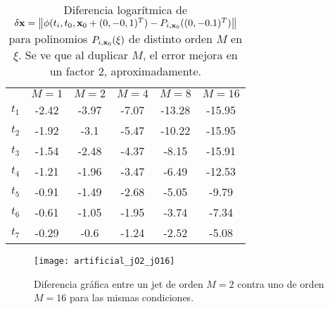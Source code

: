 \begin{table}[h!]
\centering
\begin{tabular}{c|ccccc}
\toprule
               & \textbf{$ M = 1 $} & \textbf{$M = 2 $} & \textbf{$ M = 4$} & \textbf{$ M = 8 $} & \textbf{$ M = 16 $} \\ \cmidrule(l){1-6} 
\textbf{$t_1$} & -2.42                      & -3.97                      & -7.07                      & -13.28                     & -15.95                        \\
\textbf{$t_2$} & -1.92                      & -3.1                       & -5.47                      & -10.22                     & -15.95                        \\
\textbf{$t_3$} & -1.54                      & -2.48                      & -4.37                      & -8.15                      & -15.91                        \\
\textbf{$t_4$} & -1.21                      & -1.96                      & -3.47                      & -6.49                      & -12.53                        \\
\textbf{$t_5$} & -0.91                      & -1.49                      & -2.68                      & -5.05                      & -9.79                         \\
\textbf{$t_6$} & -0.61                      & -1.05                      & -1.95                      & -3.74                      & -7.34                         \\
\textbf{$t_7$} & -0.29                      & -0.6                       & -1.24                      & -2.52                      & -5.08                         \\ \bottomrule 
\end{tabular}
\caption{Diferencia logarítmica de $\delta \mathbf{x} = \left\lVert \phi(t_i,t_0,\mathbf{x}_0 + (0,-0,1)^T) - P_{i,\mathbf{x}_0}((0,-0.1)^T) \right\rVert$ para polinomios $P_{i,\mathbf{x}_0}(\xi)$ de distinto orden $M$ en $\xi$. Se ve que al duplicar $M$, el error mejora en un factor $2$, aproximadamente.}
\label{table:djet_artificial}
\end{table}

\begin{figure}[h!]
 \centering
 \texttt{[image: artificial\_jO2\_jO16]}
 \caption{Diferencia gráfica entre un jet de orden $M=2$ contra uno de orden $M=16$ para las mismas condiciones.}
 \label{fig:artificial_jO2_jO16}
\end{figure}

